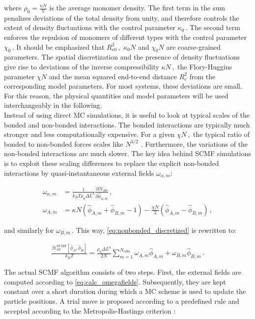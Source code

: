 \documentclass[bachelor,       %
               twoside,        %
               BCOR10mm,       %
               ngerman, english %
               ]{GAUBM}
\begin{document}
where $\rho_0=\frac{nN}{V}$ is the average monomer density. The first term in the sum penalizes deviations of the total density from unity, and therefore controls the extent of density fluctuations with the control parameter $\kappa_0\,.$ The second term enforces the repulsion of monomers of different types with the control parameter $\chi_0\,.$ It should be emphasized that $R_{e0}^2\,,$ $\kappa_0N$ and $\chi_0N$ are coarse-grained parameters. The spatial discretization and the presence of density fluctuations give rise to deviations of the inverse compressibility $\kappa N\,,$ the Flory-Huggins parameter $\chi N$ and the mean squared end-to-end distance $R_e^2$ from the corresponding model parameters. For most systems, these deviations are small. For this reason, the physical quantities and model parameters will be used interchangeably in the following. \\
Instead of using direct \ac{MC} simulations, it is useful to look at typical scales of the bonded and non-bonded interactions. The bonded interactions are typically much stronger and less computationally expensive. For a given $\chi N\,,$ the typical ratio of bonded to non-bonded forces scales like $N^{3/2}$ \cite{Mueller_daoulas11}. Furthermore, the variations of the non-bonded interactions are much slower. The key idea behind \ac{SCMF} simulations is to exploit these scaling differences to replace the explicit non-bonded interactions by quasi-instantaneous external fields $\omega_{\alpha,m}$:


\begin{align}
    \omega_{\alpha,m}&=\frac{1}{k_BT\rho_0\Delta L^3}\frac{\partial \mathcal H_{\text{nb}}}{\partial \hat\phi_{\alpha,m}}\,,\nonumber \\
    \omega_{A,m}&=\kappa N\left(\hat\phi_{A,m}+\hat\phi_{B,m}-1\right)-\frac{\chi N}{2}\left(\hat\phi_{A,m}-\hat\phi_{B,m}\right)\,,
    \label{eq:calc_omegafields}
\end{align}

and similarly for $\omega_{B,m}\,.$ This way, \eqref{eq:nonbonded_discretized} is rewritten to:

\begin{align}
    \frac{\mathcal H_\text{nb}^{\text{SCMF}}[\hat\phi_A,\hat\phi_B]}{k_BT}=\frac{\rho_0\Delta L^3}{2N}\sum_{m=1}^{N_\text{cells}}\omega_{A,m}\hat\phi_{A,m}+\omega_{B,m}\hat\phi_{B,m}\,.
\end{align}

The actual \ac{SCMF} algorithm consists of two steps. First, the external fields are computed according to \eqref{eq:calc_omegafields}. Subsequently, they are kept constant over a short duration during which a \ac{MC} scheme is used to update the particle positions. A trial move is proposed according to a predefined rule and accepted according to the Metropolis-Hastings criterion \cite{metropolis}:
\end{document}
